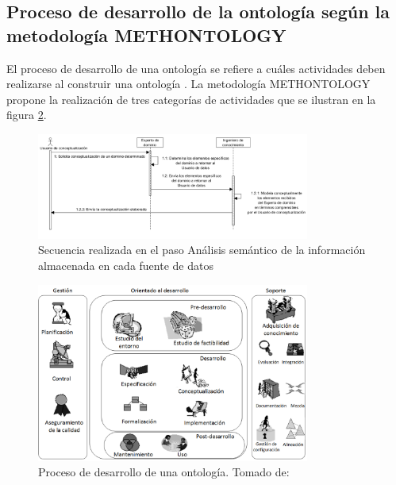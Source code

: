 \subsection{Proceso de desarrollo de la ontología según la metodología METHONTOLOGY}
El proceso de desarrollo de una ontología se refiere a cuáles actividades deben realizarse al construir una ontología \citep{Gomez-Perez:2007:OEE:1199560}. La metodología METHONTOLOGY propone la realización de tres categorías de actividades que se ilustran en la figura \ref{fig: methontology}.

\begin{figure}
\begin{center}
	\includegraphics[width=0.8\textwidth]{img/conceptsExtraction.png}
\end{center}
\caption{Secuencia realizada en el paso Análisis semántico de la información almacenada en cada fuente de datos}
\label{fig: conceptsExtraction}
\end{figure}

\begin{figure}
\begin{center}
	\includegraphics[width=0.8\textwidth]{img/Diagrama_METHONTOLOGY.png}
\end{center}
\caption{Proceso de desarrollo de una ontología. Tomado de: \citep{Gomez-Perez:2007:OEE:1199560}}
\label{fig: methontology}
\end{figure}

